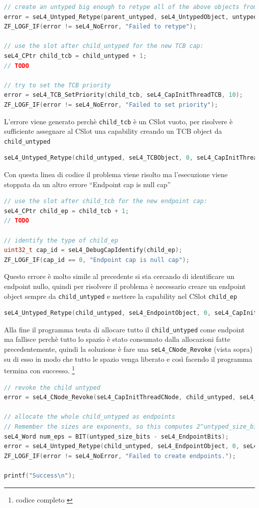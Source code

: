 \begin{lstlisting}[language=C++]
// create an untyped big enough to retype all of the above objects from
error = seL4_Untyped_Retype(parent_untyped, seL4_UntypedObject, untyped_size_bits, seL4_CapInitThreadCNode, 0, 0, child_untyped, 1);
ZF_LOGF_IF(error != seL4_NoError, "Failed to retype");

// use the slot after child_untyped for the new TCB cap:
seL4_CPtr child_tcb = child_untyped + 1;
// TODO

// try to set the TCB priority
error = seL4_TCB_SetPriority(child_tcb, seL4_CapInitThreadTCB, 10);
ZF_LOGF_IF(error != seL4_NoError, "Failed to set priority");
\end{lstlisting}
L'errore viene generato perchè \texttt{child\_tcb} è un CSlot vuoto, per risolvere è sufficiente assegnare al CSlot una capability creando un TCB object da \texttt{child\_untyped}
\begin{lstlisting}[language=C++]
seL4_Untyped_Retype(child_untyped, seL4_TCBObject, 0, seL4_CapInitThreadCNode, 0, 0, child_tcb, 1);
\end{lstlisting}
Con questa linea di codice il problema viene risolto ma l'esecuzione viene stoppata da un altro errore “Endpoint cap is null cap”
\begin{lstlisting}[language=C++]
// use the slot after child_tcb for the new endpoint cap:
seL4_CPtr child_ep = child_tcb + 1;
// TODO

// identify the type of child_ep
uint32_t cap_id = seL4_DebugCapIdentify(child_ep);
ZF_LOGF_IF(cap_id == 0, "Endpoint cap is null cap");
\end{lstlisting}
Questo errore è molto simile al precedente si sta cercando di identificare un endpoint nullo, quindi per risolvere il problema è necessario creare un endpoint object sempre da \texttt{child\_untyped} e mettere la capability nel CSlot \texttt{child\_ep}
\begin{lstlisting}[language=C++]
seL4_Untyped_Retype(child_untyped, seL4_EndpointObject, 0, seL4_CapInitThreadCNode, 0, 0, child_ep, 1);
\end{lstlisting}
Alla fine il programma tenta di allocare tutto il \texttt{child\_untyped} come endpoint ma fallisce perchè tutto lo spazio è stato consumato dalla allocazioni fatte precedentemente, quindi la soluzione è fare una \texttt{seL4\_CNode\_Revoke} (vista sopra) su di esso in modo che tutto le spazio venga liberato e così facendo il programma termina con successo. \footnote{codice completo \cite{untyped}}
\begin{lstlisting}[language=C++]
// revoke the child untyped
error = seL4_CNode_Revoke(seL4_CapInitThreadCNode, child_untyped, seL4_WordBits);

// allocate the whole child_untyped as endpoints
// Remember the sizes are exponents, so this computes 2^untyped_size_bits / 2^seL4_EndpointBits:
seL4_Word num_eps = BIT(untyped_size_bits - seL4_EndpointBits);
error = seL4_Untyped_Retype(child_untyped, seL4_EndpointObject, 0, seL4_CapInitThreadCNode, 0, 0, child_tcb, num_eps);
ZF_LOGF_IF(error != seL4_NoError, "Failed to create endpoints.");

printf("Success\n");
\end{lstlisting}

